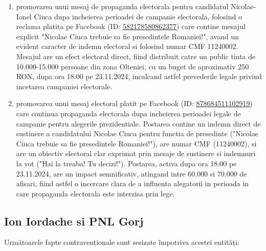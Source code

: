 \documentclass[a4paper,12pt]{article}
\begin{document}
\begin{enumerate}[leftmargin=*, label=\arabic*.)]
    \item promovarea unui mesaj de propaganda electorala pentru candidatul Nicolae-Ionel Ciuca dupa incheierea perioadei de campanie electorala, folosind o reclama platita pe Facebook (ID: \href{https://www.facebook.com/ads/library/?id=582178580862377}{582178580862377}) care contine mesajul explicit "Nicolae Ciuca trebuie sa fie presedintele Romaniei!", avand un evident caracter de indemn electoral si folosind numar CMF 11240002. Mesajul are un efect electoral direct, fiind distribuit catre un public tinta de 10.000-15.000 persoane din zona Olteniei, cu un buget de aproximativ 250 RON, dupa ora 18:00 pe 23.11.2024, incalcand astfel prevederile legale privind incetarea campaniei electorale.
    \item promovarea unui mesaj electoral platit pe Facebook (ID: \href{https://www.facebook.com/ads/library/?id=878684511102919}{878684511102919}) care continua propaganda electorala dupa incheierea perioadei legale de campanie pentru alegerile prezidentiale. Postarea contine un indemn direct de sustinere a candidatului Nicolae Ciuca pentru functia de presedinte ("Nicolae Ciuca trebuie sa fie presedintele Romaniei!"), are numar CMF (11240002), si are un obiectiv electoral clar exprimat prin mesaje de sustinere si indemnuri la vot ("Hai la treaba! Tu decizi!"). Postarea, activa dupa ora 18:00 pe 23.11.2024, are un impact semnificativ, atingand intre 60.000 si 70.000 de afisari, fiind astfel o incercare clara de a influenta alegatorii in perioada in care propaganda electorala este interzisa prin lege.
\end{enumerate}

\vspace{0.5cm}

\subsection{Ion Iordache si PNL Gorj}
Următoarele fapte contravenționale sunt sesizate împotriva acestei entități:
\end{document}

